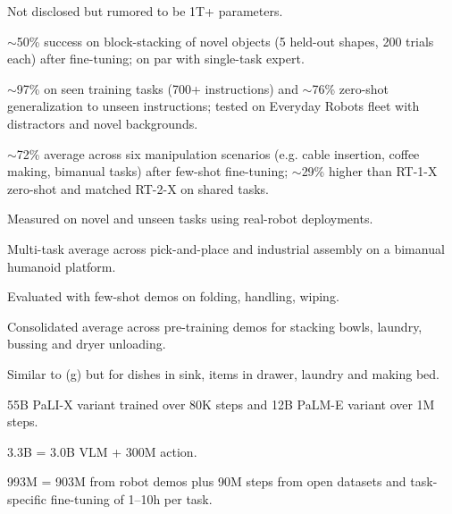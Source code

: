 \begin{widetable}[htbp]
\begin{threeparttable}
    \begin{tablenotes}
      \footnotesize
      \item[*] Not disclosed but rumored to be 1T+ parameters.\\
      \item[a] $\sim$50\% success on block-stacking of novel objects (5 held-out shapes, 200 trials each) after fine-tuning; on par with single-task expert.\\
      \item[b] $\sim$97\% on seen training tasks (700+ instructions) and $\sim$76\% zero-shot generalization to unseen instructions; tested on Everyday Robots fleet with distractors and novel backgrounds.\\
      \item[c] $\sim$72\% average across six manipulation scenarios (e.g. cable insertion, coffee making, bimanual tasks) after few-shot fine-tuning; $\sim$29\% higher than RT-1-X zero-shot and matched RT-2-X on shared tasks.\\
      \item[d] Measured on novel and unseen tasks using real-robot deployments.\\
      \item[e] Multi-task average across pick-and-place and industrial assembly on a bimanual humanoid platform.\\
      \item[f] Evaluated with few-shot demos on folding, handling, wiping.\\
      \item[g] Consolidated average across pre-training demos for stacking bowls, laundry, bussing and dryer unloading.\\
      \item[h] Similar to (g) but for dishes in sink, items in drawer, laundry and making bed.\\
      \item[i] 55B PaLI-X variant trained over 80K steps and 12B PaLM-E variant over 1M steps.\\
      \item[k] 3.3B = 3.0B \ac{VLM} + 300M action.\\
      \item[l] 993M = 903M from robot demos plus 90M steps from open datasets and task-specific fine-tuning of 1--10h per task.\\
    \end{tablenotes}

  \end{threeparttable}
\end{widetable}


